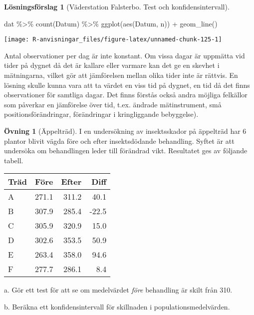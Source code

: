 \documentclass[
]{book}
\newenvironment{Shaded}{\begin{snugshade}}{\end{snugshade}}
\newcommand{\FunctionTok}[1]{\textcolor[rgb]{0.00,0.00,0.00}{#1}}
\newcommand{\NormalTok}[1]{#1}
\newcommand{\SpecialCharTok}[1]{\textcolor[rgb]{0.00,0.00,0.00}{#1}}
\theoremstyle{definition}
\theoremstyle{definition}
\theoremstyle{definition}
\newtheorem{exercise}{Övning}[chapter]
\theoremstyle{definition}
\newtheorem{hypothesis}{Lösningsförslag}[chapter]
\theoremstyle{remark}
\begin{document}
\begin{hypothesis}[Väderstation Falsterbo. Test och konfidensintervall]
\begin{Shaded}
\begin{Highlighting}[]
\NormalTok{dat }\SpecialCharTok{\%\textgreater{}\%} \FunctionTok{count}\NormalTok{(Datum) }\SpecialCharTok{\%\textgreater{}\%} \FunctionTok{ggplot}\NormalTok{(}\FunctionTok{aes}\NormalTok{(Datum, n)) }\SpecialCharTok{+} \FunctionTok{geom\_line}\NormalTok{()}
\end{Highlighting}
\end{Shaded}

\begin{center}\texttt{[image: R-anvisningar\_files/figure-latex/unnamed-chunk-125-1]} \end{center}

Antal observationer per dag är inte konstant. Om vissa dagar är uppmätta vid tider på dygnet då det är kallare eller varmare kan det ge en skevhet i mätningarna, vilket gör att jämförelsen mellan olika tider inte är rättvis. En lösning skulle kunna vara att ta värdet en viss tid på dygnet, en tid då det finns observationer för samtliga dagar. Det finns förstås också andra möjliga felkällor som påverkar en jämförelse över tid, t.ex. ändrade mätinstrument, små positionsförändringar, förändringar i kringliggande bebyggelse).
\end{hypothesis}

\begin{exercise}[Äppelträd]
I en undersökning av insektsskador på äppelträd har 6 plantor blivit vägda före och efter insektsdödande behandling. Syftet är att undersöka om behandlingen leder till förändrad vikt. Resultatet ges av följande tabell.

\begin{table}
\centering
\begin{tabular}[t]{lrrr}
\toprule
Träd & Före & Efter & Diff\\
\midrule
A & 271.1 & 311.2 & 40.1\\
B & 307.9 & 285.4 & -22.5\\
C & 305.9 & 320.9 & 15.0\\
D & 302.6 & 353.5 & 50.9\\
E & 263.4 & 358.0 & 94.6\\
\addlinespace
F & 277.7 & 286.1 & 8.4\\
\bottomrule
\end{tabular}
\end{table}

a. Gör ett test för att se om medelvärdet \emph{före} behandling är skilt från 310.

b. Beräkna ett konfidensintervall för skillnaden i populationsmedelvärden.
\end{exercise}
\end{document}
